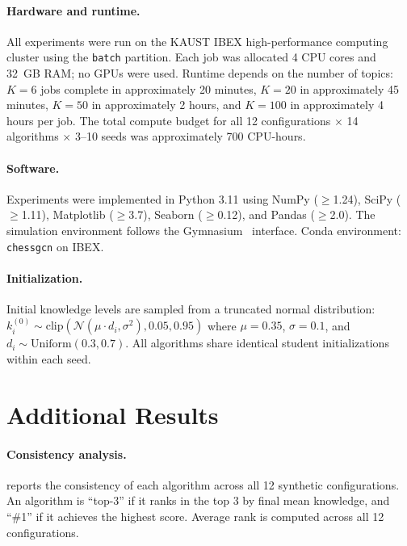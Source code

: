 \paragraph{Hardware and runtime.}
All experiments were run on the KAUST IBEX high-performance computing cluster using the \texttt{batch} partition.
Each job was allocated 4 CPU cores and 32~GB RAM; no GPUs were used.
Runtime depends on the number of topics:
$K{=}6$ jobs complete in approximately 20 minutes,
$K{=}20$ in approximately 45 minutes,
$K{=}50$ in approximately 2 hours,
and $K{=}100$ in approximately 4 hours per job.
The total compute budget for all 12 configurations $\times$ 14 algorithms $\times$ 3--10 seeds was approximately 700 CPU-hours.

\paragraph{Software.}
Experiments were implemented in Python 3.11 using NumPy ($\geq$1.24), SciPy ($\geq$1.11), Matplotlib ($\geq$3.7), Seaborn ($\geq$0.12), and Pandas ($\geq$2.0).
The simulation environment follows the Gymnasium~\citep{towers2024gymnasium} interface.
Conda environment: \texttt{chessgcn} on IBEX.

\paragraph{Initialization.}
Initial knowledge levels are sampled from a truncated normal distribution:
$k_i^{(0)} \sim \mathrm{clip}(\mathcal{N}(\mu \cdot d_i, \sigma^2), 0.05, 0.95)$
where $\mu = 0.35$, $\sigma = 0.1$, and $d_i \sim \mathrm{Uniform}(0.3, 0.7)$.
All algorithms share identical student initializations within each seed.

\section{Additional Results}
\label{app:additional}

\paragraph{Consistency analysis.}
 reports the consistency of each algorithm across all 12 synthetic configurations.
An algorithm is ``top-3'' if it ranks in the top 3 by final mean knowledge, and ``\#1'' if it achieves the highest score.
Average rank is computed across all 12 configurations.

